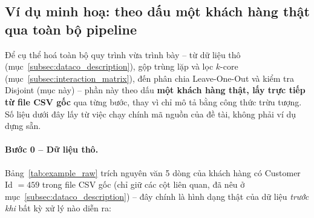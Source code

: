\subsection{Ví dụ minh hoạ: theo dấu một khách hàng thật qua toàn bộ pipeline}
\label{subsec:pipeline_walkthrough}

Để cụ thể hoá toàn bộ quy trình vừa trình bày -- từ dữ liệu thô (mục~\ref{subsec:dataco_description}), gộp trùng lặp và lọc $k$-core (mục~\ref{subsec:interaction_matrix}), đến phân chia Leave-One-Out và kiểm tra Disjoint (mục này) -- phần này theo dấu \textbf{một khách hàng thật, lấy trực tiếp từ file CSV gốc} qua từng bước, thay vì chỉ mô tả bằng công thức trừu tượng. Số liệu dưới đây lấy từ việc chạy chính mã nguồn của đề tài, không phải ví dụ dựng sẵn.

\paragraph{Bước 0 -- Dữ liệu thô.} Bảng~\ref{tab:example_raw} trích nguyên văn 5 dòng của khách hàng có Customer Id $=459$ trong file CSV gốc (chỉ giữ các cột liên quan, đã nêu ở mục~\ref{subsec:dataco_description}) -- đây chính là hình dạng thật của dữ liệu \emph{trước khi} bất kỳ xử lý nào diễn ra:

\begin{table}[htbp]
    \centering
    \caption{5 dòng dữ liệu thô của Customer Id 459, trích nguyên văn từ CSV gốc}
    \label{tab:example_raw}
\end{table}

